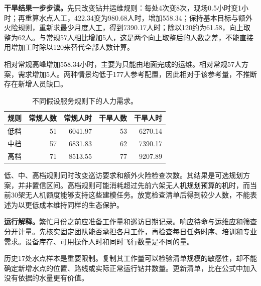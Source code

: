 \documentclass[12pt,a4paper]{article}
\numberwithin{equation}{section}
\begin{document}
\noindent\textbf{干旱结果一步步读。}先只改变钻井运维规则：每处4次变8次，现场0.5小时变1小时；再重算水点人工，422.34变为980.68人时，增加558.34；保持基本目标与额外火险规则，重新求最少月度人工，得到7390.17人时；除以120约为61.58，向上取整为62人。与常规57人相比增加5人，这是两个向上取整后的人数之差，不能直接用增加工时除以120来替代全部人数计算。


相对常规高峰增加558.34小时，主要为只能由地面完成的运维。相对常规57人方案，需求增加5人。两种情景均低于177人参考配置，因此相对于该参考量，不推断存在新增人员缺口。

\begin{table}[H]
\centering\normalsize
\caption{不同假设服务规则下的人力需求。}
\label{tab:standards}
\begin{tabular}{lrrrr}
\toprule
规则 & 常规人数 & 常规人时 & 干旱人数 & 干旱人时 \\
\midrule
低档 & 51 & 6041.97 & 53 & 6270.14 \\
中档 & 57 & 6831.83 & 62 & 7390.17 \\
高档 & 71 & 8513.55 & 77 & 9207.89 \\
\bottomrule
\end{tabular}
\end{table}

低、中、高档规则同时改变巡访要求和额外火险检查次数。其结果是可选规划方案，并非置信区间。高档规则可能消耗超过先前六架无人机规划预算的机时，而当前30架无人机额度能够支持这些建模任务。放宽检查清单后得到较少人数，不能表述为以更低成本维持同样的生态保护。

\textbf{运行解释。}繁忙月份之前应准备工作量和巡访日期记录。响应待命与运维应和筛查分开计量。先核实固定团队能否承担各月工作，再检查每日任务时序、培训和专业需求。设备库存、可用操作人时和同时飞行数量是不同的量。

历史17处水点样本是重要限制。复制其工作量可以检验清单规模的敏感性，却不能确定新增水点的位置、路线或实际正常运行钻井数量。更新清单，比在公式中加入没有依据的水量更有价值。
\clearpage

\end{document}
